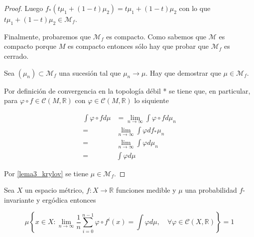 \begin{proof}
	Luego $f_*(t\mu_1 + (1-t)\mu_2) = t\mu_1 + (1-t)\mu_2$ con lo que $t\mu_1 + (1-t)\mu_2 \in \mathcal{M}_f$.
	
	Finalmente, probaremos que $\mathcal{M}_f$ es compacto. Como sabemos que $\mathcal{M}$ es compacto porque $M$ es compacto entonces sólo hay que probar que $\mathcal{M}_f$ es cerrado.
	
	Sea $(\mu_n) \subset \mathcal{M}_f$ una sucesión tal que $\mu_n \rightarrow \mu$. Hay que demostrar que $\mu \in \mathcal{M}_f$.
	
	Por definición de convergencia en la topología débil * se tiene que, en particular, para $\varphi \circ f \in \mathcal{C}(M,\mathbb{R})$ con $\varphi \in \mathcal{C}(M,\mathbb{R})$ lo siquiente
	
	\begin{align}
	\int \varphi \circ f d\mu &= \lim_{n \rightarrow \infty} \int \varphi \circ f d\mu_n\\
	=& \lim_{n \rightarrow \infty} \int \varphi df_*\mu_n\\
	=& \lim_{n \rightarrow \infty} \int \varphi d\mu_n\\
	=& \int \varphi d\mu
	\end{align}
	
	Por \ref{lema3_krylov} se tiene $\mu \in \mathcal{M}_f$.
\end{proof}



\begin{teorema}\label{birkhoff_thm}
	Sea $X$ un espacio métrico, $f: X \rightarrow \mathbb{R}$ funciones medible y $\mu$ una probabilidad $f$-invariante y ergódica entonces
	
	\begin{equation}
		\mu \left\lbrace x \in X: \lim_{n \rightarrow \infty} \frac{1}{n} \sum_{i=0}^{n-1} \varphi \circ f^i(x) = \int \varphi d\mu, \quad \forall \varphi \in \mathcal{C}(X, \mathbb{R}) \right\rbrace = 1
	\end{equation}
\end{teorema}